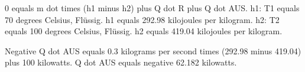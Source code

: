 0 equals m dot times (h1 minus h2) plus Q dot R plus Q dot AUS.  
h1: T1 equals 70 degrees Celsius, Flüssig.  
h1 equals 292.98 kilojoules per kilogram.  
h2: T2 equals 100 degrees Celsius, Flüssig.  
h2 equals 419.04 kilojoules per kilogram.  

Negative Q dot AUS equals 0.3 kilograms per second times (292.98 minus 419.04) plus 100 kilowatts.  
Q dot AUS equals negative 62.182 kilowatts.